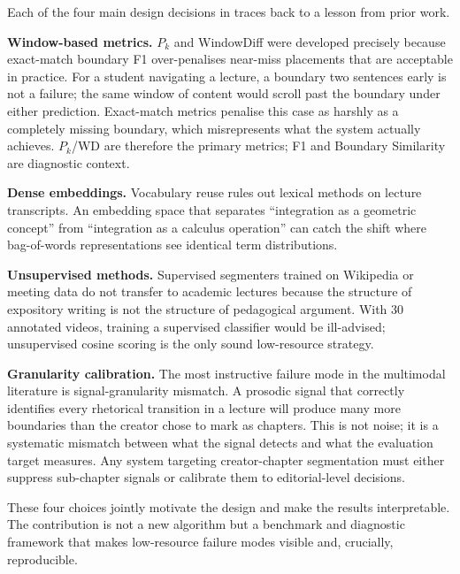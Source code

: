 Each of the four main design decisions in \lecseg{} traces back to a lesson
from prior work.

\textbf{Window-based metrics.} $P_k$ and WindowDiff were developed precisely
because exact-match boundary F1 over-penalises near-miss placements that are
acceptable in practice. For a student navigating a lecture, a boundary two
sentences early is not a failure; the same window of content would scroll past
the boundary under either prediction. Exact-match metrics penalise this case
as harshly as a completely missing boundary, which misrepresents what the
system actually achieves. $P_k$/WD are therefore the primary metrics; F1 and
Boundary Similarity are diagnostic context.

\textbf{Dense embeddings.} Vocabulary reuse rules out lexical methods on
lecture transcripts. An embedding space that separates ``integration as a
geometric concept'' from ``integration as a calculus operation'' can catch the
shift where bag-of-words representations see identical term distributions.

\textbf{Unsupervised methods.} Supervised segmenters trained on Wikipedia or
meeting data do not transfer to academic lectures because the structure of
expository writing is not the structure of pedagogical argument. With 30
annotated videos, training a supervised classifier would be ill-advised;
unsupervised cosine scoring is the only sound low-resource strategy.

\textbf{Granularity calibration.} The most instructive failure mode in the
multimodal literature is signal-granularity mismatch. A prosodic signal that
correctly identifies every rhetorical transition in a lecture will produce
many more boundaries than the creator chose to mark as chapters. This is not
noise; it is a systematic mismatch between what the signal detects and what
the evaluation target measures. Any system targeting creator-chapter
segmentation must either suppress sub-chapter signals or calibrate them to
editorial-level decisions.

These four choices jointly motivate the \lecseg{} design and make the results
interpretable. The contribution is not a new algorithm but a benchmark and
diagnostic framework that makes low-resource failure modes visible and,
crucially, reproducible.

